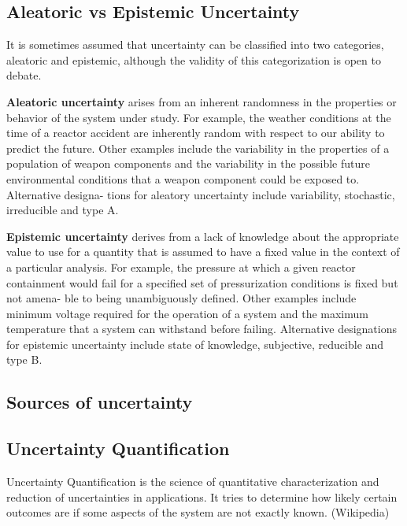 \subsection{Aleatoric vs Epistemic Uncertainty}

It is sometimes assumed that uncertainty can be classified into two categories, aleatoric and epistemic, \cite{Kiureghian2009} although the validity of this categorization is open to debate. 

\textbf{Aleatoric uncertainty} arises from an inherent randomness in the properties or behavior of the system under study. For example, the weather conditions at the time of a reactor accident are inherently random with respect to our ability to predict the future. Other examples include the variability in the properties of a population of weapon components and the variability in the possible future environmental conditions that a weapon component could be exposed to. Alternative designa- tions for aleatory uncertainty include variability, stochastic, irreducible and type A. \cite{Helton2009}

\textbf{Epistemic uncertainty} derives from a lack of knowledge about the appropriate value to use for a quantity that is assumed to have a fixed value in the context of a particular analysis. For example, the pressure at which a given reactor containment would fail for a specified set of pressurization conditions is fixed but not amena- ble to being unambiguously defined. Other examples include minimum voltage required for the operation of a system and the maximum temperature that a system can withstand before failing. Alternative designations for epistemic uncertainty include state of knowledge, subjective, reducible and type B. \cite{Helton2009}

\subsection{Sources of uncertainty}

\subsection{Uncertainty Quantification}

\begin{defn}
Uncertainty Quantification is the science of quantitative characterization and reduction of uncertainties in applications. It tries to determine how likely certain outcomes are if some aspects of the system are not exactly known. (Wikipedia)
\end{defn}

